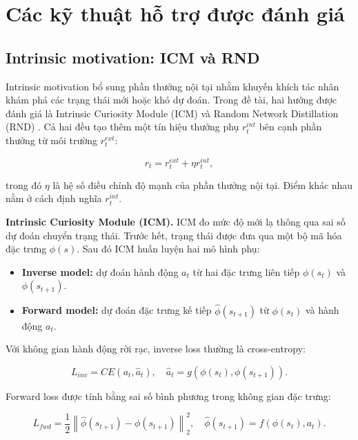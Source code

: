 \section{Các kỹ thuật hỗ trợ được đánh giá}
\subsection{Intrinsic motivation: ICM và RND}

Intrinsic motivation bổ sung phần thưởng nội tại nhằm khuyến khích tác nhân khám phá các trạng thái mới hoặc khó dự đoán. Trong đề tài, hai hướng được đánh giá là Intrinsic Curiosity Module (ICM) \cite{Pathak2017} và Random Network Distillation (RND) \cite{Burda2018}. Cả hai đều tạo thêm một tín hiệu thưởng phụ $r_t^{int}$ bên cạnh phần thưởng từ môi trường $r_t^{ext}$:

\begin{equation}
    r_t = r_t^{ext} + \eta r_t^{int},
\end{equation}

trong đó $\eta$ là hệ số điều chỉnh độ mạnh của phần thưởng nội tại. Điểm khác nhau nằm ở cách định nghĩa $r_t^{int}$.

\textbf{Intrinsic Curiosity Module (ICM).}
ICM đo mức độ mới lạ thông qua sai số dự đoán chuyển trạng thái. Trước hết, trạng thái được đưa qua một bộ mã hóa đặc trưng $\phi(s)$. Sau đó ICM huấn luyện hai mô hình phụ:

\begin{itemize}
    \item \textbf{Inverse model:} dự đoán hành động $a_t$ từ hai đặc trưng liên tiếp $\phi(s_t)$ và $\phi(s_{t+1})$.
    \item \textbf{Forward model:} dự đoán đặc trưng kế tiếp $\hat{\phi}(s_{t+1})$ từ $\phi(s_t)$ và hành động $a_t$.
\end{itemize}

Với không gian hành động rời rạc, inverse loss thường là cross-entropy:

\begin{equation}
    L_{inv} =
    CE\left(a_t,\hat{a}_t\right),
    \quad
    \hat{a}_t =
    g\left(\phi(s_t),\phi(s_{t+1})\right).
\end{equation}

Forward loss được tính bằng sai số bình phương trong không gian đặc trưng:

\begin{equation}
    L_{fwd} =
    \frac{1}{2}
    \left\|
    \hat{\phi}(s_{t+1}) - \phi(s_{t+1})
    \right\|_2^2,
    \quad
    \hat{\phi}(s_{t+1}) =
    f\left(\phi(s_t),a_t\right).
\end{equation}

